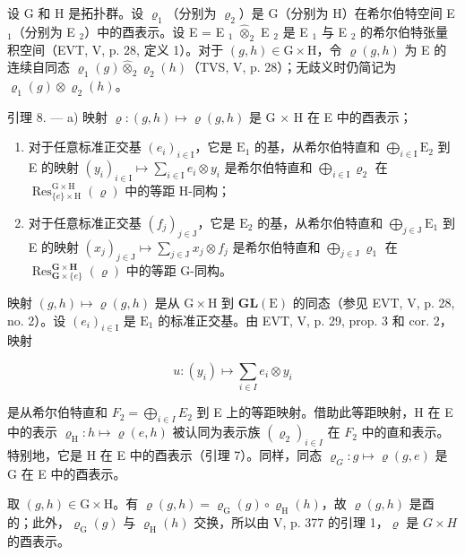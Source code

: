 设 G 和 H 是拓扑群。设 \(\varrho_{1}\)（分别为 \(\varrho_{2}\)）是 G（分别为 H）在希尔伯特空间 E \(_{1}\)（分别为 E \(_{2}\)）中的酉表示。设 E = E \(_{1}\) \(\widehat{\otimes}_{2}\) E \(_{2}\) 是 E \(_{1}\) 与 E \(_{2}\) 的希尔伯特张量积空间（EVT, V, p. 28, 定义 1）。对于 \((g,h)\in\mathrm{G}\times\mathrm{H}\)，令 \(\varrho(g,h)\) 为 E 的连续自同态 \(\varrho_{1}(g)\widehat{\otimes}_{2}\varrho_{2}(h)\)（TVS, V, p. 28）；无歧义时仍简记为 \(\varrho_{1}(g)\otimes\varrho_{2}(h)\)。

引理 8. --- a) 映射 \(\varrho\colon(g,h)\mapsto\varrho(g,h)\) 是 G × H 在 E 中的酉表示；

\begin{enumerate}
\def\labelenumi{\alph{enumi})}
\setcounter{enumi}{1}
\item
  对于任意标准正交基 \((e_i)_{i\in \mathrm{I}}\)，它是 \(\mathrm{E}_1\) 的基，从希尔伯特直和 \(\bigoplus_{i\in \mathrm{I}}\mathrm{E}_2\) 到 E 的映射 \((y_i)_{i\in \mathrm{I}}\mapsto \sum_{i\in \mathrm{I}}e_i\otimes y_i\) 是希尔伯特直和 \(\bigoplus_{i\in \mathrm{I}}\varrho_2\) 在 \(\operatorname {Res}_{\{e\} \times \mathrm{H}}^{\mathrm{G}\times \mathrm{H}}(\varrho)\) 中的等距 H-同构；
\item
  对于任意标准正交基 \((f_j)_{j\in \mathrm{J}}\)，它是 \(\mathrm{E}_2\) 的基，从希尔伯特直和 \(\bigoplus_{j\in \mathrm{J}}\mathrm{E}_1\) 到 E 的映射 \((x_{j})_{j\in \mathrm{J}}\mapsto \sum_{j\in \mathrm{J}}x_{j}\otimes f_{j}\) 是希尔伯特直和 \(\bigoplus_{j\in \mathrm{J}}\varrho_1\) 在 \(\operatorname {Res}_{\mathbf{G}\times \{e\}}^{\mathbf{G}\times \mathbf{H}}(\varrho)\) 中的等距 G-同构。
\end{enumerate}

映射 \((g,h)\mapsto\varrho(g,h)\) 是从 \(\mathrm{G}\times\mathrm{H}\) 到 \(\mathbf{GL}(\mathrm{E})\) 的同态（参见 EVT, V, p. 28, no. 2）。设 \((e_{i})_{i\in\mathrm{I}}\) 是 \(\mathrm{E}_{1}\) 的标准正交基。由 EVT, V, p. 29, prop. 3 和 cor. 2，映射

\[
u \colon (y _ {i}) \mapsto \sum_ {i \in I} e _ {i} \otimes y _ {i}
\]

是从希尔伯特直和 \(F_{2} = \bigoplus_{i \in I} E_{2}\) 到 E 上的等距映射。借助此等距映射，H 在 E 中的表示 \(\varrho_{\mathrm{H}} \colon h \mapsto \varrho(e, h)\) 被认同为表示族 \((\varrho_{2})_{i\in I}\) 在 \(F_{2}\) 中的直和表示。特别地，它是 H 在 E 中的酉表示（引理 7）。同样，同态 \(\varrho_{G}: g \mapsto \varrho(g,e)\) 是 G 在 E 中的酉表示。

取 \((g,h)\in\mathrm{G}\times\mathrm{H}\)。有 \(\varrho(g,h)=\varrho_{\mathrm{G}}(g)\circ\varrho_{\mathrm{H}}(h)\)，故 \(\varrho(g,h)\) 是酉的；此外，\(\varrho_{\mathrm{G}}(g)\) 与 \(\varrho_{\mathrm{H}}(h)\) 交换，所以由 V, p. 377 的引理 1，\(\varrho\) 是 \(G\times H\) 的酉表示。

